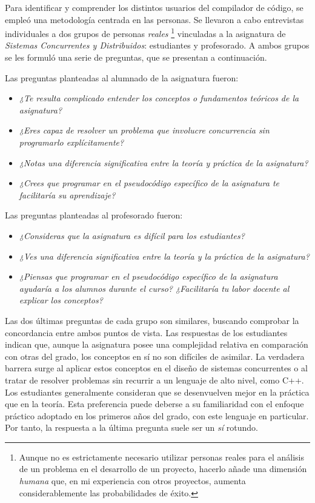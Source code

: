 Para identificar y comprender los distintos usuarios del compilador de código, se empleó una metodología centrada en las personas. Se llevaron a cabo entrevistas individuales a dos grupos de personas \textit{reales} \footnote{Aunque no es estrictamente necesario utilizar personas reales para el análisis de un problema en el desarrollo de un proyecto, hacerlo añade una dimensión \textit{humana} que, en mi experiencia con otros proyectos, aumenta considerablemente las probabilidades de éxito.} vinculadas a la asignatura de \textit{Sistemas Concurrentes y Distribuidos}: estudiantes y profesorado. A ambos grupos se les formuló una serie de preguntas, que se presentan a continuación.

\noindent
Las preguntas planteadas al alumnado de la asignatura fueron:
\begin{itemize}
    \item \textit{¿Te resulta complicado entender los conceptos o fundamentos teóricos de la asignatura?}
    \item \textit{¿Eres capaz de resolver un problema que involucre concurrencia sin programarlo explícitamente?}
    \item \textit{¿Notas una diferencia significativa entre la teoría y práctica de la asignatura?}
    \item \textit{¿Crees que programar en el pseudocódigo específico de la asignatura te facilitaría su aprendizaje?}
\end{itemize}

\noindent
Las preguntas planteadas al profesorado fueron:
\begin{itemize}
    \item \textit{¿Consideras que la asignatura es difícil para los estudiantes?}
    \item \textit{¿Ves una diferencia significativa entre la teoría y la práctica de la asignatura?}
    \item \textit{¿Piensas que programar en el pseudocódigo específico de la asignatura ayudaría a los alumnos durante el curso? ¿Facilitaría tu labor docente al explicar los conceptos?}
\end{itemize}

Las dos últimas preguntas de cada grupo son similares, buscando comprobar la concordancia entre ambos puntos de vista. Las respuestas de los estudiantes indican que, aunque la asignatura posee una complejidad relativa en comparación con otras del grado, los conceptos en sí no son difíciles de asimilar. La verdadera barrera surge al aplicar estos conceptos en el diseño de sistemas concurrentes o al tratar de resolver problemas sin recurrir a un lenguaje de alto nivel, como C++. Los estudiantes generalmente consideran que se desenvuelven mejor en la práctica que en la teoría. Esta preferencia puede deberse a su familiaridad con el enfoque práctico adoptado en los primeros años del grado, con este lenguaje en particular. Por tanto, la respuesta a la última pregunta suele ser un \textit{sí} rotundo.

